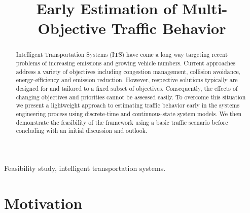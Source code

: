 \documentclass[conference]{../cls/IEEEtran}
\begin{document}
\title{Early Estimation of Multi-Objective Traffic Behavior}

\author{
	\and
}

\maketitle

\begin{abstract}
Intelligent Transportation Systems (ITS) have come a long way targeting recent problems of increasing emissions and growing vehicle numbers. Current approaches address a variety of objectives including congestion management, collision avoidance, energy-efficiency and emission reduction. However, respective solutions typically are designed for and tailored to a fixed subset of objectives. Consequently, the effects of changing objectives and priorities cannot be assessed easily. To overcome this situation we present a lightweight approach to estimating traffic behavior early in the systems engineering process using discrete-time and continuous-state system models. We then demonstrate the feasibility of the framework using a basic traffic scenario before concluding with an initial discussion and outlook.
\end{abstract}

\begin{IEEEkeywords}
Feasibility study, intelligent transportation systems.
\end{IEEEkeywords}

\section{Motivation}
\end{document}
